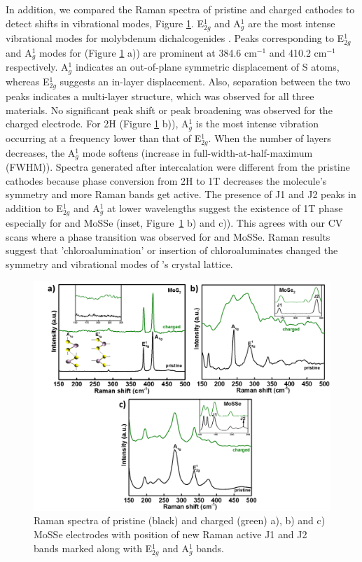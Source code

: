 In addition, we compared the Raman spectra of pristine and charged cathodes to detect shifts in vibrational modes, Figure \ref{Figures/chap4fig:fig5}. E$^1_{2g}$ and A$^1_g$ are the most intense vibrational modes for molybdenum dichalcogenides \cite{yang_pressure-induced_2019,sharma_stable_2018}. Peaks corresponding to E$^1_{2g}$ and A$^1_g$ modes for  (Figure \ref{Figures/chap4fig:fig5} a)) are prominent at 384.6 cm$^{-1}$ and 410.2 cm$^{-1}$ respectively. A$^1_g$ indicates an out-of-plane symmetric displacement of S atoms, whereas E$^1_{2g}$ suggests an in-layer displacement. Also, separation between the two peaks indicates a multi-layer structure, which was observed for all three materials. No significant peak shift or peak broadening was observed for the charged  electrode. For 2H  (Figure \ref{Figures/chap4fig:fig5} b)), A$^1_g$ is the most intense vibration occurring at a frequency lower than that of E$^1_{2g}$. When the number of layers decreases, the A$^1_g$ mode softens (increase in full-width-at-half-maximum (FWHM)). Spectra generated after intercalation were different from the pristine cathodes because phase conversion from 2H to 1T decreases the molecule's symmetry and more Raman bands get active. The presence of J1 and J2 peaks in addition to E$^1_{2g}$ and A$^1_g$ at lower wavelengths suggest the existence of 1T phase especially for  and MoSSe (inset, Figure\ \ref{Figures/chap4fig:fig5} b) and c)). This agrees with our CV scans where a phase transition was observed for  and MoSSe. Raman results suggest that 'chloroalumination' or insertion of chloroaluminates changed the symmetry and vibrational modes of 's crystal lattice. 

\begin{figure}
  \centering
  \includegraphics[width=\textwidth]{Figures/chap4fig/fig5}
  \caption{Raman spectra of pristine (black) and charged (green) a), b)  and c) MoSSe electrodes with position of new Raman active J1 and J2 bands marked along with E$^1_{2g}$ and A$^1_g$ bands.}
  \label{Figures/chap4fig:fig5}
\end{figure}

